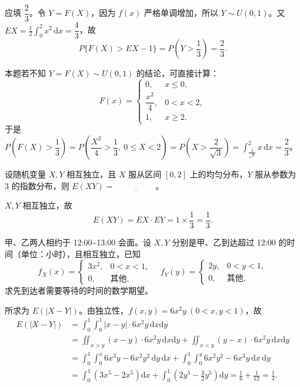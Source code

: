 \documentclass[lang=cn,11pt]{elegantbook}
\begin{document}
\begin{solution}
应填 \(\dfrac{2}{3}\)。令 \(Y = F(X)\)，因为 \(f(x)\) 严格单调增加，所以 \(Y \sim U(0,1)\)。又 \(EX = \frac12\int_0^2 x^2\,\mathrm{d}x = \dfrac{4}{3}\)，故
\[
P\{F(X) > EX - 1\} = P\!\left(Y > \frac{1}{3}\right) = \frac{2}{3}.
\]
\end{solution}
\begin{note}
本题若不知 \(Y = F(X) \sim U(0,1)\) 的结论，可直接计算：
\[
F(x) = \begin{cases} 0, & x \leqslant 0, \\ \dfrac{x^2}{4}, & 0 < x < 2, \\ 1, & x \geqslant 2. \end{cases}
\]
于是 \(P\!\left(F(X) > \dfrac{1}{3}\right) = P\!\left(\dfrac{X^2}{4} > \dfrac{1}{3},\ 0 \leqslant X < 2\right) = P\!\left(X > \dfrac{2}{\sqrt{3}}\right) = \displaystyle\int_{\frac{2}{\sqrt{3}}}^{2} x\,\mathrm{d}x = \dfrac{2}{3}\)。
\end{note}


\begin{exercise}\label{exer:4-6-exy}
设随机变量 \(X, Y\) 相互独立，且 \(X\) 服从区间 \([0,2]\) 上的均匀分布，\(Y\) 服从参数为 3 的指数分布，则 \(E(XY) =\,\underline{\hspace{2cm}}\)。
\end{exercise}
\begin{solution}
\(X, Y\) 相互独立，故
\[
E(XY) = EX \cdot EY = 1 \times \frac{1}{3} = \frac{1}{3}.
\]
\end{solution}


\begin{exercise}\label{exer:4-8-wait}
甲、乙两人相约于 12:00\textasciitilde 13:00 会面。设 \(X, Y\) 分别是甲、乙到达超过 12:00 的时间（单位：小时），且相互独立，已知
\[
f_X(x) = \begin{cases} 3x^2, & 0 < x < 1, \\ 0, & \text{其他}, \end{cases}\quad
f_Y(y) = \begin{cases} 2y, & 0 < y < 1, \\ 0, & \text{其他}, \end{cases}
\]
求先到达者需要等待的时间的数学期望。
\end{exercise}
\begin{solution}
所求为 \(E(|X-Y|)\)。由独立性，\(f(x,y) = 6x^2y\ (0 < x,y < 1)\)，故
\[
\begin{aligned}
E(|X-Y|) &= \int_0^1\!\!\int_0^1 |x-y| \cdot 6x^2 y\,\mathrm{d}x\mathrm{d}y \\
&= \iint_{x>y} (x-y) \cdot 6x^2 y\,\mathrm{d}x\mathrm{d}y + \iint_{x<y} (y-x) \cdot 6x^2 y\,\mathrm{d}x\mathrm{d}y \\
&= \int_0^1\!\!\int_0^x 6x^3y - 6x^2y^2\,\mathrm{d}y\,\mathrm{d}x + \int_0^1\!\!\int_0^y 6x^2y^2 - 6x^3y\,\mathrm{d}x\,\mathrm{d}y \\
&= \int_0^1 \!\left(3x^5 - 2x^5\right)\mathrm{d}x + \int_0^1 \!\left(2y^5 - \frac{3}{2}y^5\right)\mathrm{d}y = \frac{1}{6} + \frac{1}{12} = \frac{1}{4}.
\end{aligned}
\]
\end{solution}
\end{document}
